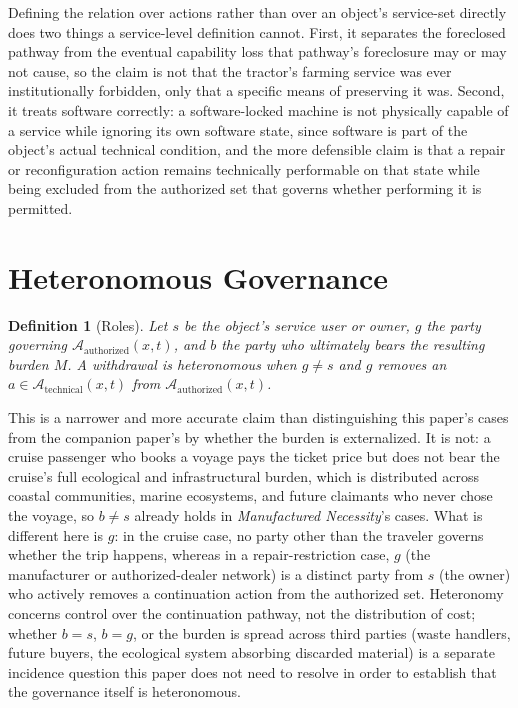 \documentclass[11pt]{article}
\newtheorem{definition}{Definition}[section]
\begin{document}
Defining the relation over actions rather than over an object's service-set directly does two things a service-level definition cannot. First, it separates the foreclosed pathway from the eventual capability loss that pathway's foreclosure may or may not cause, so the claim is not that the tractor's farming service was ever institutionally forbidden, only that a specific means of preserving it was. Second, it treats software correctly: a software-locked machine is not physically capable of a service while ignoring its own software state, since software is part of the object's actual technical condition, and the more defensible claim is that a repair or reconfiguration action remains technically performable on that state while being excluded from the authorized set that governs whether performing it is permitted.

\section{Heteronomous Governance}

\begin{definition}[Roles]
Let $s$ be the object's service user or owner, $g$ the party governing $\mathcal{A}_{\text{authorized}}(x,t)$, and $b$ the party who ultimately bears the resulting burden $M$. A withdrawal is \emph{heteronomous} when $g \neq s$ and $g$ removes an $a \in \mathcal{A}_{\text{technical}}(x,t)$ from $\mathcal{A}_{\text{authorized}}(x,t)$.
\end{definition}

This is a narrower and more accurate claim than distinguishing this paper's cases from the companion paper's by whether the burden is externalized. It is not: a cruise passenger who books a voyage pays the ticket price but does not bear the cruise's full ecological and infrastructural burden, which is distributed across coastal communities, marine ecosystems, and future claimants who never chose the voyage, so $b \neq s$ already holds in \emph{Manufactured Necessity}'s cases. What is different here is $g$: in the cruise case, no party other than the traveler governs whether the trip happens, whereas in a repair-restriction case, $g$ (the manufacturer or authorized-dealer network) is a distinct party from $s$ (the owner) who actively removes a continuation action from the authorized set. Heteronomy concerns control over the continuation pathway, not the distribution of cost; whether $b = s$, $b = g$, or the burden is spread across third parties (waste handlers, future buyers, the ecological system absorbing discarded material) is a separate incidence question this paper does not need to resolve in order to establish that the governance itself is heteronomous.
\end{document}
